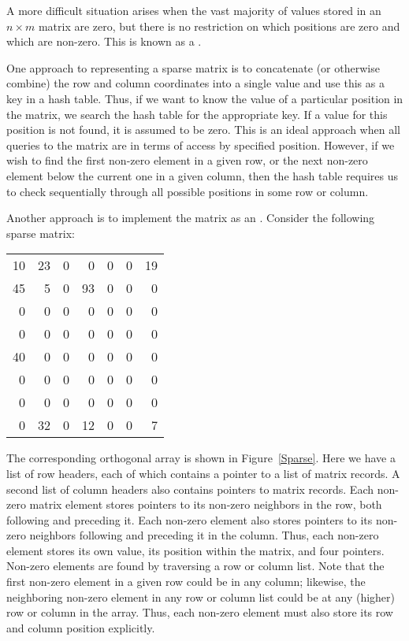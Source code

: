 A more difficult situation arises when the vast
majority of values stored in an $n \times m$ matrix are zero, but
there is no restriction on which positions are zero and which are
non-zero.
This is known as a .

One approach to representing a sparse matrix is to concatenate
(or otherwise combine) the row and column coordinates into a single
value and use this as a key in a hash table.
Thus, if we want to know the value of a particular position in the
matrix, we search the hash table for the appropriate key.
If a value for this position is not found, it is assumed to be zero.
This is an ideal approach when all queries to the
matrix are in terms of access by specified position.
However, if we wish to find the first non-zero element in a given row,
or the next non-zero element below the current one in a given column,
then the hash table requires us to check sequentially through all
possible positions in some row or column.

Another approach is to implement the matrix as an
.
Consider the following sparse matrix:

\begin{center}
\begin{tabular}{rrrrrrr}
10&23&0 &0 &0&0&19\\
45&5 &0 &93&0&0&0 \\
0 &0 &0 &0 &0&0&0 \\
0 &0 &0 &0 &0&0&0 \\
40&0 &0 &0 &0&0&0 \\
0 &0 &0 &0 &0&0&0 \\
0 &0 &0 &0 &0&0&0 \\
0 &32&0 &12&0&0&7 \\
\end{tabular}
\end{center}

The corresponding orthogonal array is shown in Figure~\ref{Sparse}.
Here we have a list of row headers, each of which contains a pointer
to a list of matrix records.
A second list of column headers also contains pointers to matrix records.
Each non-zero matrix element stores pointers to its non-zero
neighbors in the row, both following and preceding it.
Each non-zero element also stores pointers to its non-zero neighbors
following and preceding it in the column.
Thus, each non-zero element stores its own value, its position within
the matrix, and four pointers.
Non-zero elements are found by traversing a row or column list.
Note that the first non-zero element in a given row could be in any
column;
likewise, the neighboring non-zero element in any row or column list
could be at any (higher) row or column in the array.
Thus, each non-zero element must also store its row and column
position explicitly.

